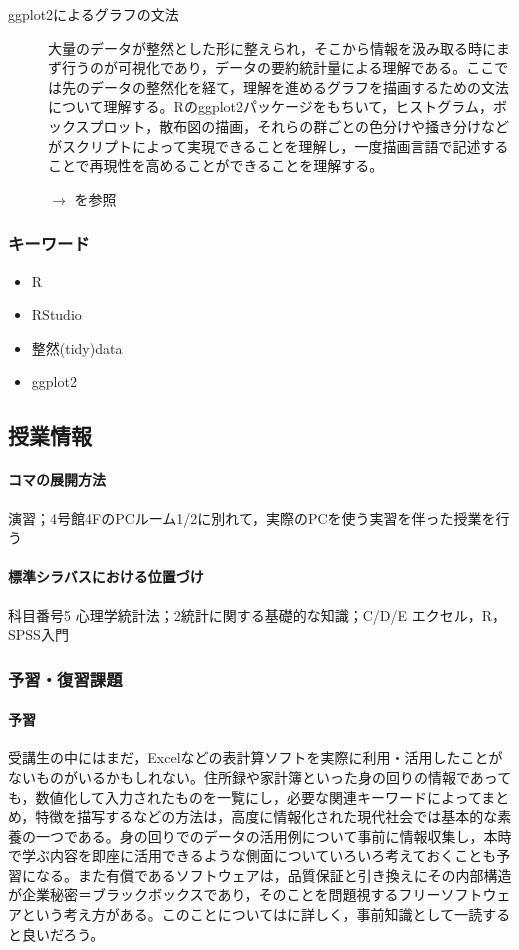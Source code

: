 \begin{description}
\item[ggplot2によるグラフの文法]大量のデータが整然とした形に整えられ，そこから情報を汲み取る時にまず行うのが可視化であり，データの要約統計量による理解である。ここでは先のデータの整然化を経て，理解を進めるグラフを描画するための文法について理解する。Rのggplot2パッケージをもちいて，ヒストグラム，ボックスプロット，散布図の描画，それらの群ごとの色分けや掻き分けなどがスクリプトによって実現できることを理解し，一度描画言語で記述することで再現性を高めることができることを理解する。
\begin{flushright}
    $\to$ \citet{紀ノ定201806}を参照
\end{flushright}

\end{description}
\subsubsection{キーワード}
\begin{itemize}
\item R
\item RStudio
\item 整然(tidy)data
\item ggplot2
\end{itemize}
\subsection{授業情報}
\paragraph{コマの展開方法}
演習；4号館4FのPCルーム1/2に別れて，実際のPCを使う実習を伴った授業を行う
\paragraph{標準シラバスにおける位置づけ}
科目番号5 心理学統計法；2統計に関する基礎的な知識；C/D/E エクセル，R，SPSS入門
\subsubsection{予習・復習課題}
\paragraph{予習}
受講生の中にはまだ，Excelなどの表計算ソフトを実際に利用・活用したことがないものがいるかもしれない。住所録や家計簿といった身の回りの情報であっても，数値化して入力されたものを一覧にし，必要な関連キーワードによってまとめ，特徴を描写するなどの方法は，高度に情報化された現代社会では基本的な素養の一つである。身の回りでのデータの活用例について事前に情報収集し，本時で学ぶ内容を即座に活用できるような側面についていろいろ考えておくことも予習になる。また有償であるソフトウェアは，品質保証と引き換えにその内部構造が企業秘密＝ブラックボックスであり，そのことを問題視するフリーソフトウェアという考え方がある。このことについては\cite{長尾200305}に詳しく，事前知識として一読すると良いだろう。
